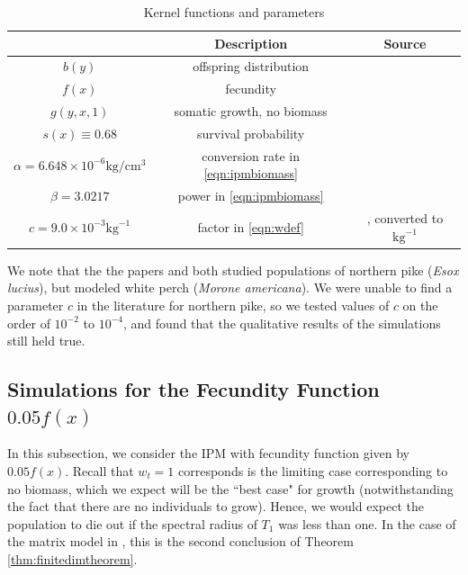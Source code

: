 \begin{table}[h!]
	\begin{center}
		\caption{Kernel functions and parameters}
		\label{tab:funcsandparams}
		\begin{tabular}{|c|c|c|}
			\hline
			 & \textbf{Description} & \textbf{Source}\\
			\hline \hline
			$b(y)$ & offspring distribution & \cite{Vindenes2014} \\
			$f(x)$ & fecundity & \cite{Vindenes2014} \\
			$g(y, x, 1)$ & somatic growth, no biomass & \cite{Vindenes2014} \\
			$s(x) \equiv 0.68$ & survival probability & \cite{Vindenes2014} \\
			$\alpha = 6.648 \times 10^{-6} \text{kg}/\text{cm}^3$ & conversion rate in \eqref{eqn:ipmbiomass} & \cite{Milardi2014} \\
			$\beta = 3.0217$ & power in \eqref{eqn:ipmbiomass} & \cite{Milardi2014} \\
			$c = 9.0 \times 10^{-3} \text{kg}^{-1}$ & factor in \eqref{eqn:wdef} & \cite{Chizinski2010}, converted to $\text{kg}^{-1}$ \\
			\hline
		\end{tabular}
	\end{center}
\end{table}

We note that the the papers \cite{Vindenes2014} and \cite{Milardi2014} both studied populations of northern pike (\emph{Esox lucius}), but \cite{Chizinski2010} modeled white perch (\emph{Morone americana}). We were unable to find a parameter $c$ in the literature for northern pike, so we tested values of $c$ on the order of $10^{-2}$ to $10^{-4}$, and found that the qualitative results of the simulations still held true.

\subsection{Simulations for the Fecundity Function $0.05f(x)$} \label{subsec:0.05f(x)}

In this subsection, we consider the IPM with fecundity function given by $0.05f(x)$. Recall that $w_t = 1$ corresponds is the limiting case corresponding to no biomass, which we expect will be the ``best case" for growth (notwithstanding the fact that there are no individuals to grow). Hence, we would expect the population to die out if the spectral radius of $T_1$ was less than one. In the case of the matrix model in \cite{Callahan2019}, this is the second conclusion of Theorem \ref{thm:finitedimtheorem}.

